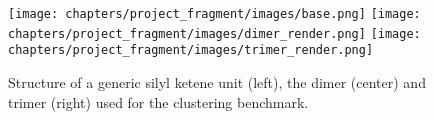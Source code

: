 \begin{figure}[h!]
    \centering
    \texttt{[image: chapters/project\_fragment/images/base.png]}     \texttt{[image: chapters/project\_fragment/images/dimer\_render.png]}     \texttt{[image: chapters/project\_fragment/images/trimer\_render.png]}
    \caption[Structures of silyl ketene systems]{Structure of a generic silyl ketene unit (left), the dimer (center) and trimer (right) used for the clustering benchmark.}
    \label{fig:sks}
\end{figure}


